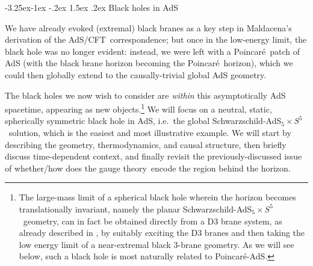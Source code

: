 \documentclass[12pt,a4paper]{article}
\makeatletter
\renewcommand\subsection{\@startsection{subsection}{2}{\z@}%
                                     {-3.25ex\@plus -1ex \@minus -.2ex}%
                                     {1.5ex \@plus .2ex}%
                                     {\normalfont\bfseries}}
\def\AC{AdS/CFT}
\def\GT{gauge theory}
\def\Poinc{Poincar\' e}
\def\schw{Schwarzschild}
\def\adss#1#2{AdS$_{#1} \times S^{#2}$}
\makeatother
\begin{document}
\subsection{Black holes in AdS}
\label{s:BHs}

We have already evoked (extremal) black branes as a key step in Maldacena's derivation \cite{Maldacena:1997re} of the \AC\ correspondence; but once in the low-energy limit, the black hole was no longer evident:  instead, we were left with a \Poinc\ patch of AdS (with the black brane horizon becoming the \Poinc\ horizon), which we could then globally extend to the causally-trivial global AdS geometry.

The black holes we now wish to consider are {\it within} this asymptotically AdS spacetime, appearing as new objects.\footnote{
The large-mass limit of a spherical black hole wherein the horizon becomes translationally invariant, namely the planar \schw-\adss55\  geometry, can in fact be obtained directly from a D3 brane system, as already described in \cite{Maldacena:1997re}, by suitably exciting the D3 branes and then taking the low energy limit of a near-extremal black 3-brane geometry.  As we will see below, such a black hole is most naturally related to \Poinc-AdS.
}
  We will focus on a neutral, static, spherically symmetric black hole in AdS, i.e.\ the global \schw-\adss55\  solution, which is the easiest and most illustrative example.   
We will start by describing the geometry, thermodynamics, and causal structure, then briefly discuss time-dependent context, and finally revisit the previously-discussed issue of whether/how does the \GT\ encode the region behind the horizon.
\end{document}
